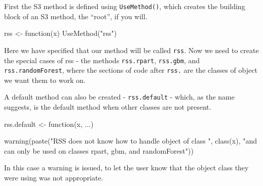 First the S3 method is defined using \texttt{UseMethod()}, which creates
the building block of an S3 method, the ``root'', if you will.

\begin{Schunk}
\begin{Sinput}
rss <- function(x) UseMethod("rss")
\end{Sinput}
\end{Schunk}

Here we have specified that our method will be called \texttt{rss}. Now
we need to create the special cases of rss - the methods
\texttt{rss.rpart}, \texttt{rss.gbm}, and \texttt{rss.randomForest},
where the sections of code after \texttt{rss.} are the classes of object
we want them to work on.

\begin{Schunk} 
\begin{Sinput} 

# RSS CART

rss.rpart \textless{}- function(x)\{

sum((residuals(x)\^{}2))

}

\# RSS BRT

rss.gbm <- function(x)\{

sum(x\$residuals\^{}2)

\}

\# RSS RF

rss.randomForest <- function(x)\{

res <- x\(y - x\)predicted

sum(res\^{}2)

\} 

\end{Sinput}
\end{Schunk}

A default method can also be created - \texttt{rss.default} - which, as
the name suggests, is the default method when other classes are not
present.

\begin{Schunk}
\begin{Sinput}
rss.default <- function(x, ...){
  
  warning(paste("RSS does not know how to handle object of class ", class(x), "and can only be used on classes rpart, gbm, and randomForest"))
          
          }
\end{Sinput}
\end{Schunk}

In this case a warning is issued, to let the user know that the object
class they were using was not appropriate.

